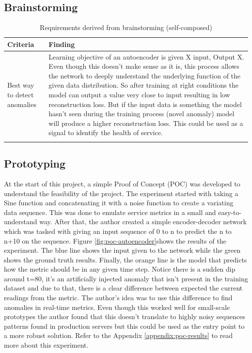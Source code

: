 
\subsection{Brainstorming}

\begin{longtable}{|p{50mm}|p{105mm}|}
    \hline
    \textbf{Criteria} &
    \textbf{Finding} \\ \hline

    Best way to detect anomalies &
    Learning objective of an autoencoder is given X input, Output X. Even though this doesn’t make sense as it is, this process allows the network to deeply understand the underlying function of the given data distribution. So after training at right conditions the model can output a value very close to input resulting in low reconstruction loss. But if the input data is something the model hasn’t seen during the training process (novel anomaly) model will produce a higher reconstruction loss. This could be used as a signal to identify the health of service. \\ \hline

    \caption{Requirements derived from brainstorming (self-composed)}
\end{longtable}

\subsection{Prototyping}

At the start of this project, a simple Proof of Concept (POC) was developed to understand the feasibility of the project. The experiment started with taking a Sine function and concatenating it with a noise function to create a variating data sequence. This was done to emulate service metrics in a small and easy-to-understand way. After that, the author created a simple encoder-decoder network which was tasked with giving an input sequence of 0 to n to predict the n to n+10 on the sequence. Figure \ref{fig:poc-autoencoder}shows the results of the experiment. The blue line shows the input given to the network while the green shows the ground truth results. Finally, the orange line is the model that predicts how the metric should be in any given time step. Notice there is a sudden dip around t=80, it's an artificially injected anomaly that isn't present in the training dataset and due to that, there is a clear difference between expected the current readings from the metric. The author's idea was to use this difference to find anomalies in real-time metrics. Even though this worked well for small-scale prototypes the author found that this doesn't translate to highly noisy sequences patterns found in production servers but this could be used as the entry point to a more robust solution. Refer to the Appendix \ref{appendix:poc-results} to read more about this experiment.

